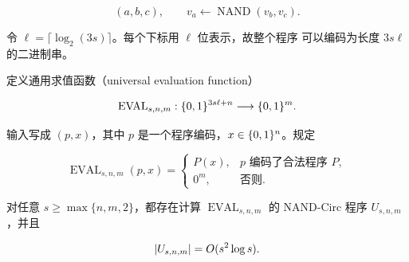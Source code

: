 \[
  (a,b,c),
  \qquad
  v_a\gets\operatorname{NAND}(v_b,v_c).
\]

令 $\ell=\lceil\log_2(3s)\rceil$。每个下标用 $\ell$ 位表示，故整个程序
可以编码为长度 $3s\ell$ 的二进制串。

\begin{example}[通用求值函数]
  \label{ex:universal-evaluation}
  定义通用求值函数（universal evaluation function）

  \[
    \operatorname{EVAL}_{s,n,m}:
    \{0,1\}^{3s\ell+n}\longrightarrow\{0,1\}^m.
  \]

  输入写成 $(p,x)$，其中 $p$ 是一个程序编码，$x\in\{0,1\}^n$。规定

  \[
    \operatorname{EVAL}_{s,n,m}(p,x)=
    \begin{cases}
      P(x), & p\text{ 编码了合法程序 }P,\\
      0^m,  & \text{否则}.
    \end{cases}
  \]
\end{example}

\begin{theorem}
  \label{thm:universal-nand-circ-program}
  对任意 $s\geq\max\{n,m,2\}$，都存在计算
  $\operatorname{EVAL}_{s,n,m}$ 的 NAND-Circ 程序 $U_{s,n,m}$，并且

  \[
    \lvert U_{s,n,m}\rvert=O(s^2\log s).
  \]
\end{theorem}

